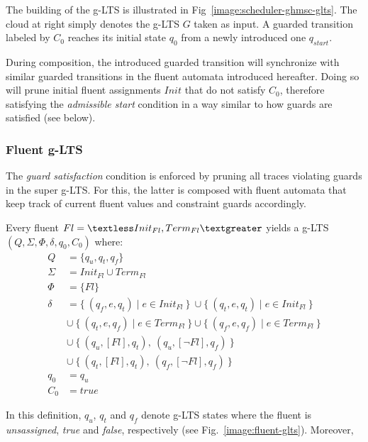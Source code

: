The building of the g-LTS is illustrated in Fig~\ref{image:scheduler-ghmsc-glts}. The cloud at right simply denotes the g-LTS $G$ taken as input. A guarded transition labeled by $C_0$ reaches its initial state $q_0$ from a newly introduced one $q_{start}$.

During composition, the introduced guarded transition will synchronize with similar guarded transitions in the fluent automata introduced hereafter. Doing so will prune initial fluent assignments $Init$ that do not satisfy $C_0$, therefore satisfying the \emph{admissible start} condition in a way similar to how guards are satisfied (see below).

\subsubsection*{Fluent g-LTS}

The \emph{guard satisfaction} condition is enforced by pruning all traces violating guards in the super g-LTS. For this, the latter is composed with fluent automata that keep track of current fluent values and constraint guards accordingly.

Every fluent $Fl = \textless Init_{Fl}, Term_{Fl} \textgreater $ yields a g-LTS $(Q,\Sigma,\Phi,\delta,q_{0},C_{0})$ where:
\begin{align*}
Q      &= \{q_u,q_t,q_f\}            \\
\Sigma &= Init_{Fl} \cup Term_{Fl}   \\
\Phi   &= \{ Fl \} \\
\delta &=    \{~(q_f,e,q_t) \mid e \in Init_{Fl}~\}~\cup \{~(q_t,e,q_t) \mid e \in Init_{Fl}~\} \\
       &\cup~\{~(q_t,e,q_f) \mid e \in Term_{Fl}~\} \cup \{~(q_f,e,q_f) \mid e \in Term_{Fl}~\} \\
       &\cup~\{~(q_u, [Fl], q_t),~(q_u, [\neg Fl], q_f)~\} \\
       &\cup~\{~(q_t, [Fl], q_t),~(q_f, [\neg Fl], q_f)~\} \\
q_0    &= q_u \\
C_0    &= true
\end{align*}

In this definition, $q_u$, $q_t$ and $q_f$ denote g-LTS states where the fluent is \emph{unsassigned}, \emph{true} and \emph{false}, respectively (see Fig.~\ref{image:fluent-glts}). Moreover,


